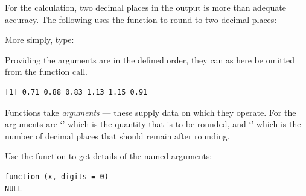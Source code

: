 For the  calculation, two decimal places in the output
is more than adequate accuracy. The following uses the function
 to round to two decimal places:
\begin{marginfigure}[24pt]
More simply, type:
\begin{knitrout}
\color{fgcolor}\begin{kframe}
\begin{alltt}
\hlopt{/} \hlstd{)}
\end{alltt}
\end{kframe}
\end{knitrout}
Providing the arguments are in the defined
order, they can as here be omitted from
the function call.
\end{marginfigure}
\begin{knitrout}
\color{fgcolor}\begin{kframe}
\begin{alltt}
\hlstd{(}\hlopt{/} \hlstd{=}\hlstd{)}
\end{alltt}
\begin{verbatim}
[1] 0.71 0.88 0.83 1.13 1.15 0.91
\end{verbatim}
\end{kframe}
\end{knitrout}

  Functions take {\em arguments} --- these supply
data on which they operate.  For  the arguments are
`' which is the quantity that is to be rounded, and
`' which is the number of decimal places that should
remain after rounding.

Use the function  to get details of the named
arguments:
\begin{knitrout}
\color{fgcolor}\begin{kframe}
\begin{alltt}
\end{alltt}
\begin{verbatim}
function (x, digits = 0) 
NULL
\end{verbatim}
\end{kframe}
\end{knitrout}

